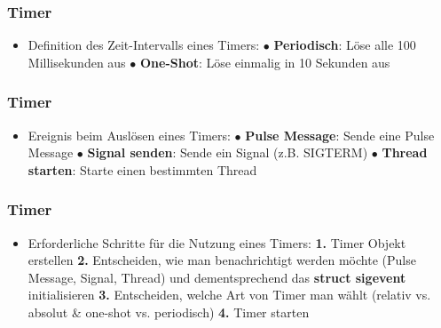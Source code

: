 \documentclass{beamer}
\begin{document}
\begin{frame}[fragile]
 \frametitle{Timer}
 \begin{itemize}
  \item Definition des Zeit-Intervalls eines Timers:\newline\newline
  $\bullet$ \textbf{Periodisch}: L\"ose alle 100 Millisekunden aus\newline\newline
  $\bullet$ \textbf{One-Shot}: L\"ose einmalig in 10 Sekunden aus
 \end{itemize}
\end{frame}

\begin{frame}[fragile]
 \frametitle{Timer}
 \begin{itemize}
  \item Ereignis beim Ausl\"osen eines Timers:\newline\newline
  $\bullet$ \textbf{Pulse Message}: Sende eine Pulse Message\newline\newline
  $\bullet$ \textbf{Signal senden}: Sende ein Signal (z.B. SIGTERM)\newline\newline
  $\bullet$ \textbf{Thread starten}: Starte einen bestimmten Thread
 \end{itemize}
\end{frame}

\begin{frame}[fragile]
 \frametitle{Timer}
 \begin{itemize}
  \item Erforderliche Schritte f\"ur die Nutzung eines Timers:\newline\newline
  \textbf{1.} Timer Objekt erstellen\newline\newline
  \textbf{2.} Entscheiden, wie man benachrichtigt werden m\"ochte (Pulse Message, Signal, Thread) und dementsprechend das \textbf{struct sigevent} initialisieren\newline\newline
  \textbf{3.} Entscheiden, welche Art von Timer man w\"ahlt (relativ vs. absolut \& one-shot vs. periodisch)\newline\newline
  \textbf{4.} Timer starten
 \end{itemize}
\end{frame}
\end{document}
